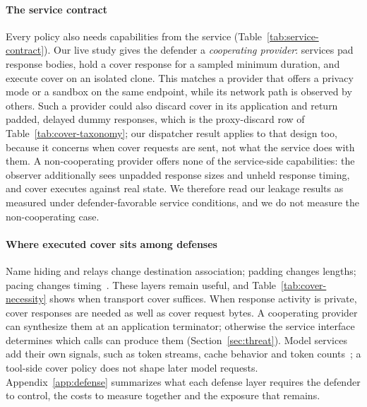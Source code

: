 \paragraph{The service contract}
Every policy also needs capabilities from the service (Table~\ref{tab:service-contract}). Our live study gives the defender a \emph{cooperating provider}: services pad response bodies, hold a cover response for a sampled minimum duration, and execute cover on an isolated clone. This matches a provider that offers a privacy mode or a sandbox on the same endpoint, while its network path is observed by others. Such a provider could also discard cover in its application and return padded, delayed dummy responses, which is the proxy-discard row of Table~\ref{tab:cover-taxonomy}; our dispatcher result applies to that design too, because it concerns when cover requests are sent, not what the service does with them. A non-cooperating provider offers none of the service-side capabilities: the observer additionally sees unpadded response sizes and unheld response timing, and cover executes against real state. We therefore read our leakage results as measured under defender-favorable service conditions, and we do not measure the non-cooperating case.



\paragraph{Where executed cover sits among defenses}
Name hiding and relays change destination association; padding changes lengths; pacing changes timing~\cite{wang2017walkietalkie,gong2020front,juarez2016wtfpad}. These layers remain useful, and Table~\ref{tab:cover-necessity} shows when transport cover suffices. When response activity is private, cover responses are needed as well as cover request bytes. A cooperating provider can synthesize them at an application terminator; otherwise the service interface determines which calls can produce them (Section~\ref{sec:threat}). Model services add their own signals, such as token streams, cache behavior and token counts~\cite{weiss2024prompt,whisperleak2025,earlybird2025,timewilltell2024,carlini2024timing}; a tool-side cover policy does not shape later model requests. Appendix~\ref{app:defense} summarizes what each defense layer requires the defender to control, the costs to measure together and the exposure that remains.
